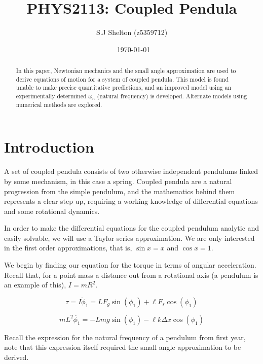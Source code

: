 \documentclass[aps,prl,reprint,10pt,amsmath,amssymb,superscriptaddress,a4paper, floatfix]{revtex4-2}
\begin{document}
\title{PHYS2113: Coupled Pendula}

\author{S.J Shelton (z5359712)}
\date{\currenttime~\today}

\begin{abstract}

In this paper, Newtonian mechanics and the small angle approximation are used to derive equations of motion for a system of coupled pendula. This model is found unable to make precise quantitative predictions, and an improved model using an experimentally determined $\omega_n$ (natural frequency) is developed. Alternate models using numerical methods are explored.

\end{abstract}

\maketitle

\section{Introduction}
A set of coupled pendula consists of two otherwise independent pendulums linked by some mechanism, in this case a spring. Coupled pendula are a natural progression from the simple pendulum, and the mathematics behind them represents a clear step up, requiring a working knowledge of differential equations and some rotational dynamics.

In order to make the differential equations for the coupled pendulum analytic and easily solvable, we will use a Taylor series approximation. We are only interested in the first order approximations, that is, $\sin x = x$ and $\cos x = 1$.

We begin by finding our equation for the torque in terms of angular acceleration. Recall that, for a point mass a distance out from a rotational axis (a pendulum is an example of this), $I = mR^2$.

\[\tau = I \ddot{\phi}_1 = L F_g \sin(\phi_1) + \ell F_s \cos(\phi_1) \]

\begin{equation}
\label{eqn1}
m L^2 \ddot{\phi_1} = -Lmg \sin \left( \phi_1 \right) - \ell k \Delta x \cos \left( \phi_1 \right)
\end{equation}

Recall the expression for the natural frequency of a pendulum from first year, note that this expression itself required the small angle approximation to be derived.
\end{document}
